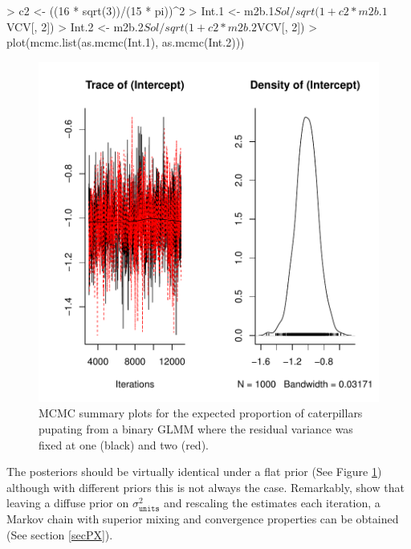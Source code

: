 \documentclass{article}
\begin{document}
\begin{Schunk}
\begin{Sinput}
> c2 <- ((16 * sqrt(3))/(15 * pi))^2
> Int.1 <- m2b.1$Sol/sqrt(1 + c2 * m2b.1$VCV[, 2])
> Int.2 <- m2b.2$Sol/sqrt(1 + c2 * m2b.2$VCV[, 2])
> plot(mcmc.list(as.mcmc(Int.1), as.mcmc(Int.2)))
\end{Sinput}
\end{Schunk}

\begin{figure}[!h]
\begin{center}
\includegraphics{Lecture2-072}
\end{center}
\caption{MCMC summary plots for the expected proportion of caterpillars pupating from  a binary GLMM where the residual variance was fixed at one (black) and two (red).}
\label{ICI-fig}
\end{figure}

The posteriors should be virtually identical under a flat prior (See Figure \ref{ICI-fig}) although with different priors this is not always the case. Remarkably, \citet{vanDyk.2001} show that leaving a diffuse prior on $\sigma^{2}_{\texttt{units}}$ and rescaling the estimates each iteration, a Markov chain with superior mixing and convergence properties can be obtained (See section \ref{secPX}).\\  
\end{document}
